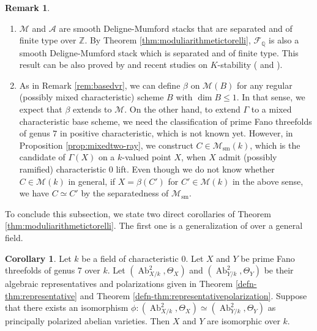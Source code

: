\documentclass[autodetect-engine, a4paper]{amsart}
\theoremstyle{definition}
\newtheorem{cor}[thm]{Corollary}
\newtheorem{rem}[thm]{Remark}
\def\Q{{\mathbb Q}}
\def\Z{{\mathbb Z}}
\DeclareMathOperator\Ab{\mathrm{Ab}}
\newcommand{\cora}{\color{black}}
\begin{document}
\begin{rem}
\begin{enumerate}
\item
$\mathcal{M}$ and $\mathcal{A}$ are smooth Deligne-Mumford stacks that are separated and of finite type over $\Z$.
By Theorem \ref{thm:moduliarithmetictorelli}, $\mathcal{F}_{\Q}$ is also a smooth Deligne-Mumford stack which is separated and of finite type.
This result can be also proved by \cite[Corollary 2.6]{Javanpeykar-Loughran:GoodReductionFano} and recent studies on $K$-stability (\cite[Theorem C]{Abban-Zhuang} and \cite[Theorem 1.1.(3)]{Blum-Xu}).
\item 
{\cora As in Remark \ref{rem:basedvr}, we can define $\beta$ on $\mathcal{M} (B)$ for any regular (possibly mixed characteristic) scheme $B$ with $\dim B \leq 1$.
In that sense, we expect that $\beta$ extends to $\mathcal{M}$.
On the other hand, to extend $\Gamma$ to a mixed characteristic base scheme, we need the classification of prime Fano threefolds of genus $7$ in positive characteristic, which is not known yet.
However, in Proposition \ref{prop:mixedtwo-ray}, we construct $C \in \mathcal{M}_{\mathrm{sm}} (k)$, which is the candidate of $\Gamma (X)$ on a $k$-valued point $X$, when $X$ admit (possibly ramified) characteristic 0 lift.
Even though we do not know whether $C \in \mathcal{M} (k)$ in general,
if $X = \beta (C')$ for $C' \in \mathcal{M} (k)$ in the above sense, we have $C \simeq C'$ by the separatedness of $\mathcal{M}_{\mathrm{sm}}$.
}
\end{enumerate}
\end{rem}

To conclude this subsection, we state two direct corollaries of Theorem \ref{thm:moduliarithmetictorelli}.
The first one is a generalization of \cite[Paragraph after Theorem 8.6]{MukaiBrill} over a general field.

\begin{cor}
\label{cor:usualarithmetictorelli}
Let $k$ be a field of characteristic $0$.
Let $X$ and $Y$ be prime Fano threefolds of genus 7 over $k$.
Let $(\Ab^2_{X/k}, \Theta_{X})$ and $(\Ab^2_{Y/k}, \Theta_{Y})$ be their algebraic representatives and polarizations given in Theorem \ref{defn-thm:representative} and Theorem \ref{defn-thm:representativepolarization}.
Suppose that there exists an isomorphism $\phi \colon (\Ab^2_{X/k}, \Theta_{X}) \simeq  (\Ab^2_{Y/k}, \Theta_{Y})$ as principally polarized abelian varieties.
Then $X$ and $Y$ are isomorphic over $k$.
\end{cor}
\end{document}
